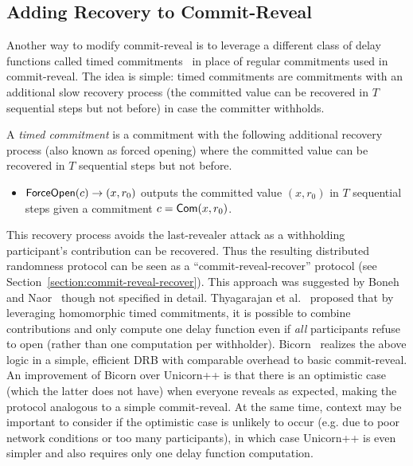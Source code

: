 \subsection{Adding Recovery to Commit-Reveal}
Another way to modify commit-reveal is to leverage a different class of delay functions called timed commitments~\cite{boneh2000timed} in place of regular commitments used in commit-reveal.
The idea is simple: timed commitments are commitments with an additional slow recovery process (the committed value can be recovered in $T$ sequential steps but not before) in case the committer withholds.

\begin{definition}
A \textit{timed commitment} is a commitment with the following additional recovery process (also known as forced opening) where the committed value can be recovered in $T$ sequential steps but not before.
\begin{itemize}
\item $\mathsf{ForceOpen}(c) \rightarrow (x, r_0)$ outputs the committed value $(x, r_0)$ in $T$ sequential steps given a commitment $c = \mathsf{Com}(x, r_0)$.
\end{itemize}
\end{definition}

This recovery process avoids the last-revealer attack as a withholding participant's contribution can be recovered. Thus the resulting distributed randomness protocol can be seen as a ``commit-reveal-recover'' protocol (see Section~\ref{section:commit-reveal-recover}).
This approach was suggested by Boneh and Naor~\cite{boneh2000timed} though not specified in detail.
Thyagarajan et al.~\cite{thyagarajan2021efficient} proposed that by leveraging homomorphic timed commitments, it is possible to combine contributions and only compute one delay function even if \emph{all} participants refuse to open (rather than one computation per withholder).
Bicorn~\cite{choi2022bicorn} realizes the above logic in a simple, efficient DRB with comparable overhead to basic commit-reveal.
An improvement of Bicorn over Unicorn++ is that there is an optimistic case (which the latter does not have) when everyone reveals as expected, making the protocol analogous to a simple commit-reveal.
At the same time, context may be important to consider if the optimistic case is unlikely to occur (e.g. due to poor network conditions or too many participants), in which case Unicorn++ is even simpler and also requires only one delay function computation.

